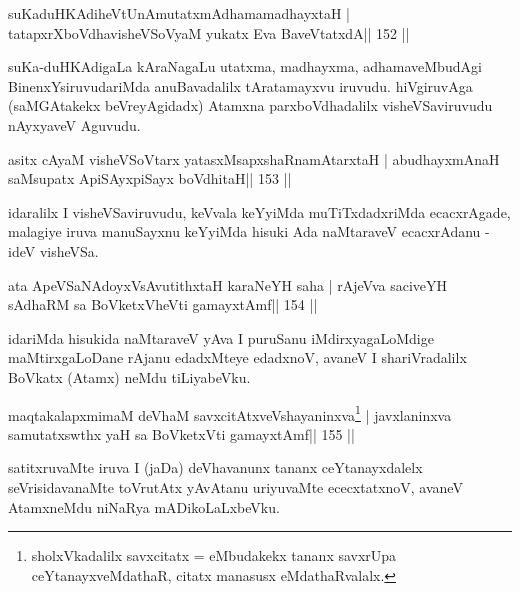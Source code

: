 
\begin{shl}
suKaduHKAdiheVtUnAmutatxmAdhamamadhayxtaH |
tatapxrXboVdhavisheVSoV\s yaM yukatx Eva BaveVtatxdA\hfill || 152 ||
\end{shl}

\begin{artha}
suKa-duHKAdigaLa kAraNagaLu utatxma, madhayxma, adhamaveMbudAgi 
BinenxYsi\-ruvudariMda anuBavadalilx tAratamayxvu iruvudu. hiVgiruvAga (saMGAtakekx beVreyAgidadx) Atamxna parxboVdhadalilx visheVSaviruvudu nAyxyaveV Aguvudu.
\end{artha}


\begin{shl}
asitx cAyaM visheVSoV\s tarx yatasxMsapxshaRnamAtarxtaH |
abudhayxmAnaH saMsupatx ApiSAyx\s\s piSayx boVdhitaH\hfill || 153 ||
\end{shl}

\begin{artha}
idaralilx I visheVSaviruvudu, keVvala keYyiMda muTiTxdadxriMda ecacxrAgade, malagiye iruva manuSayxnu keYyiMda hisuki Ada naMtaraveV ecacxrAdanu - ideV visheVSa.
\end{artha}

\begin{shl}
ata ApeVSaNAdoyxV\s sAvutithxtaH karaNeYH saha |
rAjeVva saciveYH sAdhaRM sa BoVketxVheVti gamayxtAmf\hfill || 154 ||
\end{shl}

\begin{artha}
idariMda hisukida naMtaraveV yAva I puruSanu iMdirxyagaLoMdige maMtirxgaLoDane rAjanu edadxMteye edadxnoV, avaneV I shariVradalilx BoVkatx (Atamx) neMdu tiLiyabeVku.
\end{artha}


\begin{shl}
maqtakalapxmimaM deVhaM savxcitAtxveVshayaninxva\footnote{sholxVkadalilx savxcitatx = eMbudakekx tananx savxrUpa ceYtanayxveMdathaR, citatx manasusx eMdathaRvalalx.} |
javxlaninxva samutatxswthx yaH sa BoVketxVti gamayxtAmf\hfill || 155 ||
\end{shl}

\begin{artha}
satitxruvaMte iruva I (jaDa) deVhavanunx tananx ceYtanayxdalelx  seVrisidavanaMte toVrutAtx yAvAtanu uriyuvaMte ececxtatxnoV, avaneV AtamxneMdu niNaRya mADikoLaLxbeVku.
\end{artha}

